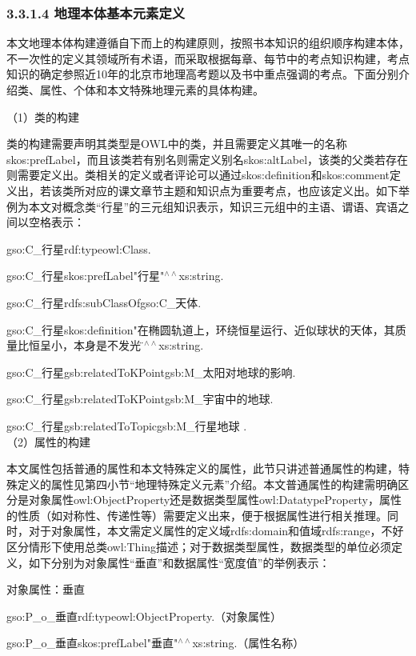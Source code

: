 \subsubsection{3.3.1.4 地理本体基本元素定义}
本文地理本体构建遵循自下而上的构建原则，按照书本知识的组织顺序构建本体，不一次性的定义其领域所有术语，而采取根据每章、每节中的考点知识构建，考点知识的确定参照近10年的北京市地理高考题以及书中重点强调的考点。下面分别介绍类、属性、个体和本文特殊地理元素的具体构建。

（1）类的构建

类的构建需要声明其类型是OWL中的类，并且需要定义其唯一的名称skos:prefLabel，而且该类若有别名则需定义别名skos:altLabel，该类的父类若存在则需要定义出。类相关的定义或者评论可以通过skos:definition和skos:comment定义出，若该类所对应的课文章节主题和知识点为重要考点，也应该定义出。如下举例为本文对概念类“行星”的三元组知识表示，知识三元组中的主语、谓语、宾语之间以空格表示：

gso:C\_行星\quad rdf:type\quad owl:Class\quad .

gso:C\_行星\quad skos:prefLabel\quad "行星"$^{\land\land}$xs:string\quad .

gso:C\_行星\quad rdfs:subClassOf\quad gso:C\_天体\quad .

gso:C\_行星\quad skos:definition\quad "在椭圆轨道上，环绕恒星运行、近似球状的天体，其质量比恒呈小，本身是不发光的\"$^{\land\land}$xs:string\quad .

gso:C\_行星\quad gsb:relatedToKPoint\quad gsb:M\_太阳对地球的影响\quad .

gso:C\_行星\quad gsb:relatedToKPoint\quad gsb:M\_宇宙中的地球\quad .

gso:C\_行星\quad gsb:relatedToTopic\quad gsb:M\_行星地球 .
\\

（2）属性的构建 

本文属性包括普通的属性和本文特殊定义的属性，此节只讲述普通属性的构建，特殊定义的属性见第四小节“地理特殊定义元素”介绍。本文普通属性的构建需明确区分是对象属性owl:ObjectProperty还是数据类型属性owl:DatatypeProperty，属性的性质（如对称性、传递性等）需要定义出来，便于根据属性进行相关推理。同时，对于对象属性，本文需定义属性的定义域rdfs:domain和值域rdfs:range，不好区分情形下使用总类owl:Thing描述；对于数据类型属性，数据类型的单位必须定义，如下分别为对象属性“垂直”和数据属性“宽度值”的举例表示：

对象属性：垂直

gso:P\_o\_垂直\quad rdf:type\quad owl:ObjectProperty\quad .（对象属性）

gso:P\_o\_垂直\quad skos:prefLabel\quad "垂直"$^{\land\land}$xs:string\quad .（属性名称）

